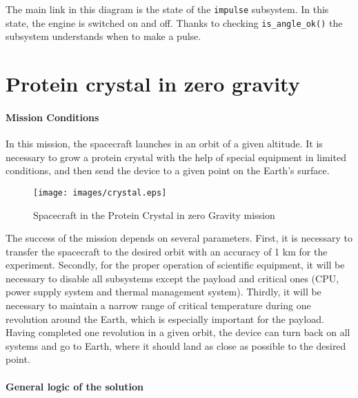 \documentclass[12pt,a4paper]{article}
\begin{document}
The main link in this diagram is the state of the \verb'impulse' subsystem. In this state, the engine is switched on and off. Thanks to checking \verb'is_angle_ok()' the subsystem understands when to make a pulse.

\section{Protein crystal in zero gravity}

\paragraph{Mission Conditions} In this mission, the spacecraft launches in an orbit of a given altitude. It is necessary to grow a protein crystal with the help of special equipment in limited conditions, and then send the device to a given point on the Earth's surface.

\begin{figure}[tbh]
  \begin{center}
    \texttt{[image: images/crystal.eps]}
    \caption{Spacecraft in the Protein Crystal in zero Gravity mission}
    \label{Pic:Crystal-en}
  \end{center}
\end{figure}

The success of the mission depends on several parameters. First, it is necessary to transfer the spacecraft to the desired orbit with an accuracy of 1 km for the experiment. Secondly, for the proper operation of scientific equipment, it will be necessary to disable all subsystems except the payload and critical ones (CPU, power supply system and thermal management system). Thirdly, it will be necessary to maintain a narrow range of critical temperature during one revolution around the Earth, which is especially important for the payload. Having completed one revolution in a given orbit, the device can turn back on all systems and go to Earth, where it should land as close as possible to the desired point.

\clearpage
\paragraph{General logic of the solution} 
\end{document}
